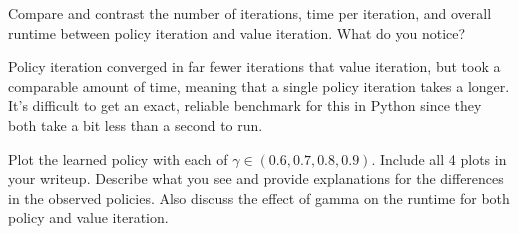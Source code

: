 \documentclass[expanded]{lkx_pset}
\begin{document}
\begin{solution}
	\begin{part}{3} Compare and contrast the number of iterations, time per iteration, and overall runtime between policy iteration and value iteration. What do you notice?
	\end{part}

	Policy iteration converged in far fewer iterations that value iteration, but took a comparable amount of time, meaning that a single policy iteration takes a longer. It's difficult to get an exact, reliable benchmark for this in Python since they both take a bit less than a second to run.

	\begin{part}{4} Plot the learned policy with each of $\gamma \in (0.6,0.7,0.8,0.9)$. Include all 4 plots in your writeup. Describe what you see and provide explanations for the differences in the observed policies. Also discuss the effect of gamma on the runtime for both policy and value iteration.
	\end{part}


\end{solution}
\end{document}
